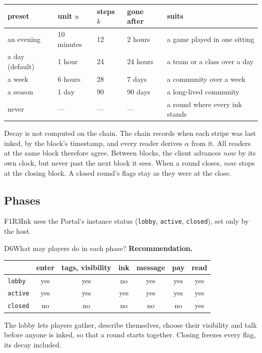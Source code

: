 \documentclass[11pt,a4paper]{article}
\newcommand{\code}[1]{\texttt{#1}}
\begin{document}
\begin{center}\small
\begin{tabular}{@{}lllll@{}}
\toprule
preset & unit $u$ & steps $k$ & gone after & suits\\
\midrule
an evening & 10 minutes & 12 & 2 hours & a game played in one sitting\\
a day (default) & 1 hour & 24 & 24 hours & a team or a class over a day\\
a week & 6 hours & 28 & 7 days & a community over a week\\
a season & 1 day & 90 & 90 days & a long-lived community\\
never & --- & --- & --- & a round where every ink stands\\
\bottomrule
\end{tabular}
\end{center}

Decay is not computed on the chain. The chain records when each stripe was last inked, by the
block's timestamp, and every reader derives $\alpha$ from it. All readers at the same block
therefore agree. Between blocks, the client advances $\mathit{now}$ by its own clock, but never
past the next block it sees. When a round closes, $\mathit{now}$ stops at the closing block. A
closed round's flags stay as they were at the close.

\subsection{Phases}

F1R3Ink uses the Portal's instance status (\code{lobby}, \code{active}, \code{closed}), set
only by the host.

\begin{decision}{D6}{What may players do in each phase?}
\textbf{Recommendation.}

\begin{tabular}{@{}lcccccc@{}}
\toprule
 & enter & tags, visibility & ink & message & pay & read\\
\midrule
\code{lobby}  & yes & yes & no  & yes & yes & yes\\
\code{active} & yes & yes & yes & yes & yes & yes\\
\code{closed} & no  & no  & no  & no  & no  & yes\\
\bottomrule
\end{tabular}\par\medskip

The lobby lets players gather, describe themselves, choose their visibility and talk before
anyone is inked, so that a round starts together. Closing freezes every flag, its decay included.
\end{decision}
\end{document}
